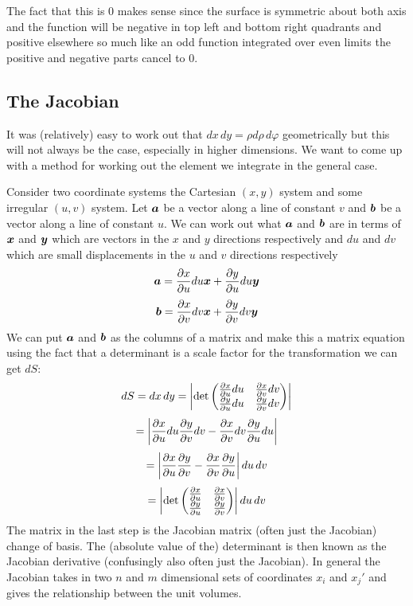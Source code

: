 \documentclass{article}
\begin{document}
    The fact that this is 0 makes sense since the surface is symmetric about both axis and the function will be negative in top left and bottom right quadrants and positive elsewhere so much like an odd function integrated over even limits the positive and negative parts cancel to 0.
    
    \subsection{The Jacobian}
    It was (relatively) easy to work out that \(dx\,dy = \rho d\rho\,d\varphi\) geometrically but this will not always be the case, especially in higher dimensions.
    We want to come up with a method for working out the element we integrate in the general case.
    
    Consider two coordinate systems the Cartesian \((x, y)\) system and some irregular \((u, v)\) system.
    Let \(\bm{a}\) be a vector along a line of constant \(v\) and \(\bm{b}\) be a vector along a line of constant \(u\).
    We can work out what \(\bm{a}\) and \(\bm{b}\) are in terms of \(\bm{x}\) and \(\bm{y}\) which are vectors in the \(x\) and \(y\) directions respectively and \(du\) and \(dv\) which are small displacements in the \(u\) and \(v\) directions respectively
    \[\bm{a} = \pdv{x}{u} du\bm{x} + \pdv{y}{u}du\bm{y}\]
    \[\bm{b} = \pdv{x}{v}dv\bm{x} + \pdv{y}{v}dv\bm{y}\]
    We can put \(\bm{a}\) and \(\bm{b}\) as the columns of a matrix and make this a matrix equation using the fact that a determinant is a scale factor for the transformation we can get \(dS\):
    \[
        dS = dx\,dy = \left |\det
        \begin{pmatrix}
            \pdv{x}{u}du & \pdv{x}{v}dv \\
            \pdv{y}{u}du & \pdv{y}{v}dv
        \end{pmatrix}
        \right |
    \]
    \[= \left |\pdv{x}{u}du\pdv{y}{v}dv - \pdv{x}{v}dv\pdv{y}{u}du\right |\]
    \[= \left |\pdv{x}{u}\pdv{y}{v} - \pdv{x}{v}\pdv{y}{u}\right |du\,dv\]
    \[
        = \left |\det
        \begin{pmatrix}
            \pdv{x}{u} & \pdv{x}{v} \\
            \pdv{y}{u} & \pdv{y}{v}
        \end{pmatrix}
        \right |du\,dv
    \]
    The matrix in the last step is the Jacobian matrix (often just the Jacobian) change of basis. The (absolute value of the) determinant is then known as the Jacobian derivative (confusingly also often just the Jacobian).
    In general the Jacobian takes in two \(n\) and \(m\) dimensional sets of coordinates \(x_i\) and \(x_j'\) and gives the relationship between the unit volumes.
\end{document}
